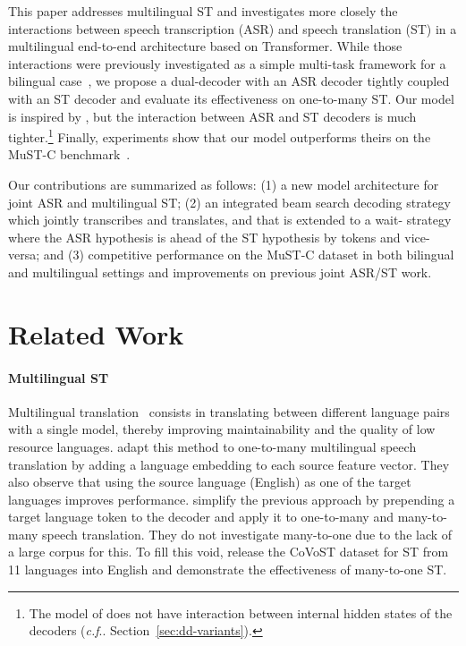 \documentclass[11pt]{article}
\makeatletter
\DeclareRobustCommand\onedot{\futurelet\@let@token\@onedot}
\def\@onedot{\ifx\@let@token.\else.\null\fi\xspace}
\def\cf{\emph{c.f}\onedot} \def\Cf{\emph{C.f}\onedot}
\theoremstyle{plain}
\theoremstyle{definition}
\makeatother
\begin{document}
This paper addresses multilingual ST and investigates more closely the interactions between speech transcription (ASR) and speech translation (ST) in a multilingual end-to-end architecture based on Transformer. While those interactions were previously investigated as a simple multi-task framework for a bilingual case~\cite{anastasopoulos2018tied}, we propose a dual-decoder with an ASR decoder tightly coupled with an ST decoder and evaluate its effectiveness on one-to-many ST. Our model is inspired by , but the interaction between ASR and ST decoders is much tighter.\footnote{The model of  does not have interaction between internal hidden states of the decoders (\cf Section~\ref{sec:dd-variants}).}
Finally, experiments show that our model outperforms theirs on the MuST-C benchmark~\cite{di2019must}.

Our contributions are summarized as follows:
(1) a new model architecture for joint ASR and multilingual ST;
(2) an integrated beam search decoding strategy which jointly transcribes and translates, and that is extended to a wait- strategy where the ASR hypothesis is ahead of the ST hypothesis by  tokens and vice-versa;
and (3) competitive performance on the MuST-C dataset 
in both bilingual and multilingual settings and improvements on previous joint ASR/ST work.

    

\section{Related Work}




\paragraph{Multilingual ST} 
Multilingual translation~\cite{googlemulti2017} consists in translating between different language pairs with a single model, thereby improving maintainability and the quality of low resource languages. 
 adapt this method to one-to-many multilingual speech translation by adding a language embedding to each source feature vector. They also observe that using the source language (English) as one of the target languages improves performance.  simplify the previous approach by prepending a target language token to the decoder and apply it to one-to-many and many-to-many speech translation. They do not investigate many-to-one due to the lack of a large corpus for this. To fill this void,  release the CoVoST dataset for ST from 11 languages into English and demonstrate the effectiveness of many-to-one ST.
\end{document}
